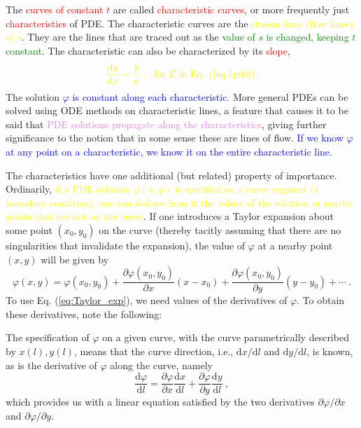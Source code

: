 \documentclass[12pt,a4paper]{article}
\newcommand{\dif}{\mathrm{d}}
\begin{document}
The \textcolor{red}{curves of constant $t$} are called \textcolor{red}{characteristic curves}, or more frequently just \textcolor{red}{characteristics} of  PDE. The characteristic curves are the \textcolor{yellow}{stream lines (flow lines) of $s$}. They are the lines that are traced out as the \textcolor{green}{value of $s$ is changed, keeping $t$ constant}. The characteristic can also be characterized by its \textcolor{red}{slope},
\begin{equation}
\color{yellow} \dfrac{\dif y}{\dif x} =  \dfrac{b}{a} ~, ~~ \text{for $\mathcal L$ in Eq. (\ref{eq:1pde}).}
\end{equation}
The solution \textcolor{blue}{$\varphi$ is constant along each characteristic}. More general PDEs can be solved using ODE methods on characteristic lines, a feature that causes it to be said that \textcolor{violet}{PDE solutions propagate along the characteristics}, giving further significance to the notion that in some sense these are lines of flow. \textcolor{blue}{If we know $\varphi$ at any point on a characteristic, we know it on the entire characteristic line}.

The characteristics have one additional (but related) property of importance. Ordinarily, \textcolor{yellow}{if a PDE solution $\varphi(x, y)$ is specified on a curve segment (a boundary condition), one can deduce from it the values of the solution at nearby points that are not on the curve}. If one introduces a Taylor expansion about some point $(x_0, y_0)$ on the curve (thereby tacitly assuming that there are no singularities that invalidate the expansion), the value of $\varphi$ at a nearby point $(x, y)$ will be given by
\begin{equation}
\varphi(x,y) = \varphi(x_0, y_0)  +\dfrac{\partial \varphi(x_0, y_0)}{\partial x} (x -x_0) +\dfrac{\partial \varphi(x_0, y_0)}{\partial y} (y -y_0) + \cdots ~.
\label{eq:Taylor_exp}
\end{equation}
To use Eq. (\ref{eq:Taylor_exp}), we need values of the derivatives of $\varphi$. To obtain these derivatives, note the following:

The specification of $\varphi$ on a given curve, with the curve parametrically described by $x(l), y(l)$, means that the curve direction, i.e., $\dif x/\dif l$ and $\dif y/\dif l$, is known, as is the derivative of $\varphi$ along the curve, namely
\begin{equation}
\dfrac{\dif \varphi}{\dif l} = \dfrac{\partial \varphi}{\partial x}\dfrac{\dif x}{\dif l} +\dfrac{\partial \varphi}{\partial y}\dfrac{\dif y}{\dif l} ~,
\label{eq:deri_curve}
\end{equation}
which provides us with a linear equation satisfied by the two derivatives $\partial \varphi/\partial x$ and $\partial \varphi/\partial y$.
\end{document}
